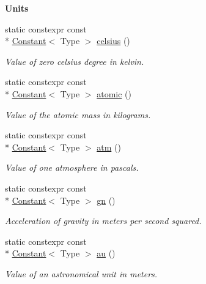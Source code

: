 \begin{Indent}{\bf Units}\par
\begin{DoxyCompactItemize}
\item 
static constexpr const \\*
\hyperlink{exceptionmagrathea_1_1Constant}{Constant}$<$ Type $>$ \hyperlink{exceptionmagrathea_1_1Constants_a1447f82a5d6cb51b40637da9d296944b}{celsius} ()
\begin{DoxyCompactList}\small\item\em Value of zero celsius degree in kelvin. \end{DoxyCompactList}\item 
static constexpr const \\*
\hyperlink{exceptionmagrathea_1_1Constant}{Constant}$<$ Type $>$ \hyperlink{exceptionmagrathea_1_1Constants_a3defdae28aeffcb0e88ed96e463d19a3}{atomic} ()
\begin{DoxyCompactList}\small\item\em Value of the atomic mass in kilograms. \end{DoxyCompactList}\item 
static constexpr const \\*
\hyperlink{exceptionmagrathea_1_1Constant}{Constant}$<$ Type $>$ \hyperlink{exceptionmagrathea_1_1Constants_a1500e45acca698fab771860fa0e689f9}{atm} ()
\begin{DoxyCompactList}\small\item\em Value of one atmosphere in pascals. \end{DoxyCompactList}\item 
static constexpr const \\*
\hyperlink{exceptionmagrathea_1_1Constant}{Constant}$<$ Type $>$ \hyperlink{exceptionmagrathea_1_1Constants_af1285e41a04a49c480493f5b077f6aec}{gn} ()
\begin{DoxyCompactList}\small\item\em Acceleration of gravity in meters per second squared. \end{DoxyCompactList}\item 
static constexpr const \\*
\hyperlink{exceptionmagrathea_1_1Constant}{Constant}$<$ Type $>$ \hyperlink{exceptionmagrathea_1_1Constants_a62e76eafbe1e6d937e952ec6da3a2c51}{au} ()
\begin{DoxyCompactList}\small\item\em Value of an astronomical unit in meters. \end{DoxyCompactList}\item 

\end{DoxyCompactItemize}
\end{Indent}
